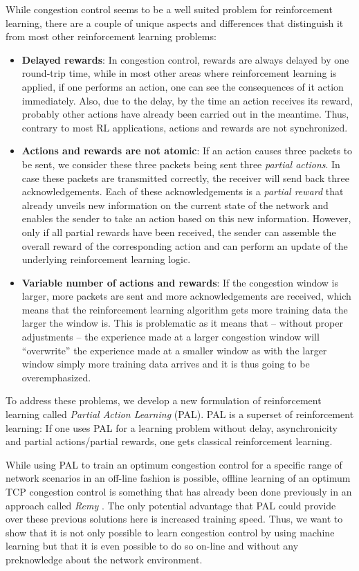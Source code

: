 \documentclass[newfonts=false,format=sigconf,10pt,letterpaper]{acmart}
\begin{document}
While congestion control seems to be a well suited problem for reinforcement learning, there are a couple of unique aspects and differences that distinguish it from most other reinforcement learning problems:  \begin{itemize}
\item \textbf{Delayed rewards}: In congestion control, rewards are always delayed by one round-trip time, while in most other areas where reinforcement learning is applied, if one performs an action, one can see the consequences of it action immediately. Also, due to the delay, by the time an action receives its reward, probably other actions have already been carried out in the meantime. Thus, contrary to most RL applications, actions and rewards are not synchronized. 
\item \textbf{Actions and rewards are not atomic}: If an action causes three packets to be sent, we consider these three packets being sent three \textit{partial actions}. In case these packets are transmitted correctly, the receiver will send back three acknowledgements. Each of these acknowledgements is a \textit{partial reward} that already unveils new information on the current state of the network and enables the sender to take an action based on this new information. However, only if all partial rewards have been received, the sender can assemble the overall reward of the corresponding action and can perform an update of the underlying reinforcement learning logic. 
\item \textbf{Variable number of actions and rewards}: If the congestion window is larger, more packets are sent and more acknowledgements are received, which means that the reinforcement learning algorithm gets more training data the larger the window is. This is problematic as it means that -- without proper adjustments -- the experience made at a larger congestion window will ``overwrite'' the experience made at a smaller window as with the larger window simply more training data arrives and it is thus going to be overemphasized. 
\end{itemize}

To address these problems, we develop a new formulation of reinforcement learning called \textit{Partial Action Learning} (PAL). PAL is a superset of reinforcement learning: If one uses PAL for a learning problem without delay, asynchronicity and partial actions/partial rewards, one gets classical reinforcement learning.

While using PAL to train an optimum congestion control for a specific range of network scenarios in an off-line fashion is possible, offline learning of an optimum TCP congestion control is something that has already been done previously in an approach called \textit{Remy} \citep{winstein_tcp_2013}. The only potential advantage that PAL could provide over these previous solutions here is increased training speed. Thus, we want to show that it is  not only possible to learn congestion control by using machine learning but that it is even possible to do so on-line and without any preknowledge about the network environment.
\end{document}

